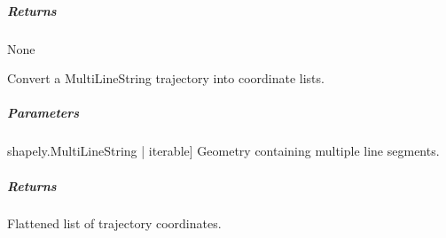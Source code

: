 \documentclass[letterpaper,10pt,english]{sphinxmanual}
\begin{document}
\begin{fulllineitems}
\begin{fulllineitems}
\begin{description}
\end{description}


\subparagraph{Returns}
\label{\detokenize{mirte_lc_nav2.navigators:id4}}
\sphinxAtStartPar
None

\end{fulllineitems}


\begin{fulllineitems}
\label{\detokenize{mirte_lc_nav2.navigators:mirte_lc_nav2.navigators.BousPath.multiline_to_coords}}
\pysigstartsignatures
\pysiglinewithargsret
{}
{}
{}
\pysigstopsignatures
\sphinxAtStartPar
Convert a MultiLineString trajectory into coordinate lists.


\subparagraph{Parameters}
\label{\detokenize{mirte_lc_nav2.navigators:id5}}\begin{description}
\sphinxlineitem{multiline}{[}shapely.MultiLineString | iterable{]}
\sphinxAtStartPar
Geometry containing multiple line segments.

\end{description}


\subparagraph{Returns}
\label{\detokenize{mirte_lc_nav2.navigators:id6}}\begin{description}
\sphinxAtStartPar
Flattened list of trajectory coordinates.

\end{description}

\end{fulllineitems}


\begin{fulllineitems}
\label{\detokenize{mirte_lc_nav2.navigators:mirte_lc_nav2.navigators.BousPath.name}}
\pysigstartsignatures
\pysigline
{}
\pysigstopsignatures
\end{fulllineitems}


\end{fulllineitems}
\end{document}
